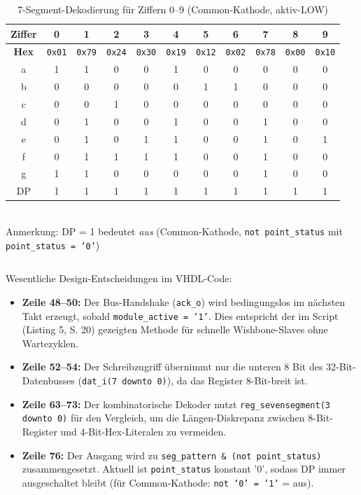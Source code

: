 \begin{table}[H]
\centering
\caption{7-Segment-Dekodierung für Ziffern 0--9 (Common-Kathode, aktiv-LOW)}
\label{tab:decoder_values}
\begin{tabular}{|c|cccccccccc|}
\hline
\textbf{Ziffer} & \textbf{0} & \textbf{1} & \textbf{2} & \textbf{3} & \textbf{4} & \textbf{5} & \textbf{6} & \textbf{7} & \textbf{8} & \textbf{9} \\
\hline
\textbf{Hex} & \texttt{0x01} & \texttt{0x79} & \texttt{0x24} & \texttt{0x30} & \texttt{0x19} & \texttt{0x12} & \texttt{0x02} & \texttt{0x78} & \texttt{0x00} & \texttt{0x10} \\
\hline
a & 1 & 1 & 0 & 0 & 1 & 0 & 0 & 0 & 0 & 0 \\
\hline
b & 0 & 0 & 0 & 0 & 0 & 1 & 1 & 0 & 0 & 0 \\
\hline
c & 0 & 0 & 1 & 0 & 0 & 0 & 0 & 0 & 0 & 0 \\
\hline
d & 0 & 1 & 0 & 0 & 1 & 0 & 0 & 1 & 0 & 0 \\
\hline
e & 0 & 1 & 0 & 1 & 1 & 0 & 0 & 1 & 0 & 1 \\
\hline
f & 0 & 1 & 1 & 1 & 1 & 0 & 0 & 1 & 0 & 0 \\
\hline
g & 1 & 1 & 0 & 0 & 0 & 0 & 0 & 1 & 0 & 0 \\
\hline
DP & 1 & 1 & 1 & 1 & 1 & 1 & 1 & 1 & 1 & 1 \\
\hline
\end{tabular}
\\[4pt]
{\small Anmerkung: DP = 1 bedeutet \textit{aus} (Common-Kathode, \texttt{not point\_status} mit \texttt{point\_status = '0'})}
\end{table}


\label{code:sevensegment_vhd}
\inputminted[linenos,frame=single,fontsize=\footnotesize, breaklines, breakindent=12pt]{vhdl}{A6_Abgabe/iceduino_setup/osflow/boards/iceduino/iceduino_sevensegment.vhd}


Wesentliche Design-Entscheidungen im VHDL-Code:
\begin{itemize}
    \item \textbf{Zeile 48--50:} Der Bus-Handshake (\texttt{ack\_o}) wird bedingungslos im nächsten Takt erzeugt, sobald \texttt{module\_active = '1'}. Dies entspricht der im Script (Listing 5, S. 20) gezeigten Methode für schnelle Wishbone-Slaves ohne Wartezyklen.
    \item \textbf{Zeile 52--54:} Der Schreibzugriff übernimmt nur die unteren 8 Bit des 32-Bit-Datenbusses (\texttt{dat\_i(7 downto 0)}), da das Register 8-Bit-breit ist.
    \item \textbf{Zeile 63--73:} Der kombinatorische Dekoder nutzt \texttt{reg\_sevensegment(3 downto 0)} für den Vergleich, um die Längen-Diskrepanz zwischen 8-Bit-Register und 4-Bit-Hex-Literalen zu vermeiden.
    \item \textbf{Zeile 76:} Der Ausgang wird zu \texttt{seg\_pattern \& (not point\_status)} zusammengesetzt. Aktuell ist \texttt{point\_status} konstant '0', sodass DP immer ausgeschaltet bleibt (für Common-Kathode: \texttt{not '0' = '1'} = aus).
\end{itemize}


